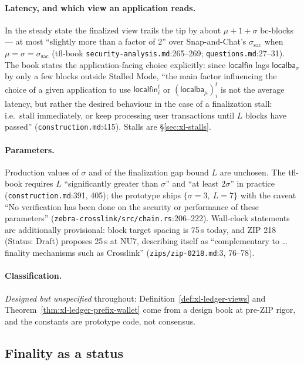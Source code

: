 \documentclass[11pt,a4paper]{article}
\theoremstyle{definition}
\begin{document}
\paragraph{Latency, and which view an application reads.} In the steady
state the finalized view trails the tip by about $\mu + 1 + \sigma$
bc-blocks --- at most ``slightly more than a factor of 2'' over
Snap-and-Chat's $\sigma_{\mathrm{sac}}$ when $\mu = \sigma =
\sigma_{\mathrm{sac}}$ (tfl-book \texttt{security-analysis.md}:265--269;
\texttt{questions.md}:27--31). The book states the application-facing
choice explicitly: since $\mathsf{localfin}$ lags
$\mathsf{localba}_{\sigma}$ by only a few blocks outside Stalled Mode,
``the main factor influencing the choice of a given application to use
$\mathsf{localfin}_i^t$ or $(\mathsf{localba}_{\mu})_i^t$ is not the
average latency, but rather the desired behaviour in the case of a
finalization stall: i.e.\ stall immediately, or keep processing user
transactions until $L$ blocks have passed''
(\texttt{construction.md}:415). Stalls are \S\ref{sec:xl-stalls}.

\paragraph{Parameters.} Production values of $\sigma$ and of the
finalization gap bound $L$ are unchosen. The tfl-book requires $L$
``significantly greater than $\sigma$'' and ``at least $2\sigma$'' in
practice (\texttt{construction.md}:391, 405); the prototype ships
$\{\sigma = 3,\ L = 7\}$ with the caveat ``No verification has been done on
the security or performance of these parameters''
(\texttt{zebra-crosslink/src/chain.rs}:206--222). Wall-clock statements
are additionally provisional: block target spacing is 75\,s today, and ZIP
218 (Status: Draft) proposes 25\,s at NU7, describing itself as
``complementary to \ldots{} finality mechanisms such as Crosslink''
(\texttt{zips/zip-0218.md}:3, 76--78).

\paragraph{Classification.} \emph{Designed but unspecified} throughout:
Definition~\ref{def:xl-ledger-views} and
Theorem~\ref{thm:xl-ledger-prefix-wallet} come from a design book at pre-ZIP
rigor, and the constants are prototype code, not consensus.

\subsection{Finality as a status}\label{sec:xl-finality-status}
\end{document}
